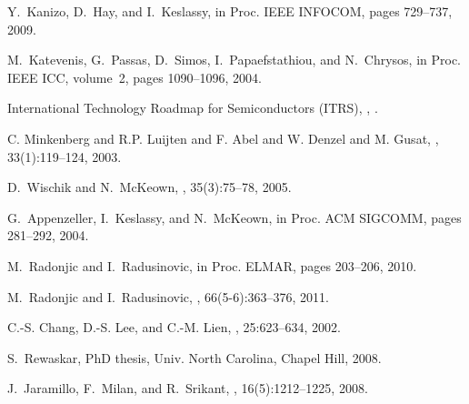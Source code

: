 \documentclass[journal,final,doublecolumn,10pt,twoside]{IEEEtranTCOM} \normalsize
\begin{document}
\begin{thebibliography}{1}
Y.~Kanizo, D.~Hay, and I.~Keslassy,
\newblock in {Proc. IEEE INFOCOM}, pages 729--737, 2009.

M.~Katevenis, G.~Passas, D.~Simos, I.~Papaefstathiou, and N.~Chrysos,
\newblock in {Proc. IEEE ICC}, volume~2, pages 1090--1096, 2004.

{International Technology Roadmap for Semiconductors (ITRS)},
,
.

{C. Minkenberg and R.P. Luijten and F. Abel and W. Denzel and M. Gusat},
, 33(1):119--124, 2003.



D.~Wischik and N.~McKeown,
, 35(3):75--78, 2005.

G.~Appenzeller, I.~Keslassy, and N.~McKeown,
\newblock in {Proc. ACM SIGCOMM}, pages 281--292, 2004.



M.~Radonjic and I.~Radusinovic,
\newblock in {Proc. ELMAR}, pages 203--206, 2010.

M.~Radonjic and I.~Radusinovic,
, 66(5-6):363--376, 2011.





C.-S. Chang, D.-S. Lee, and C.-M. Lien,
, 25:623--634, 2002.



S.~Rewaskar,
\newblock PhD thesis, Univ. North Carolina, Chapel Hill, 2008.





J.~Jaramillo, F.~Milan, and R.~Srikant,
, 16(5):1212--1225, 2008.


\end{thebibliography}
\end{document}

